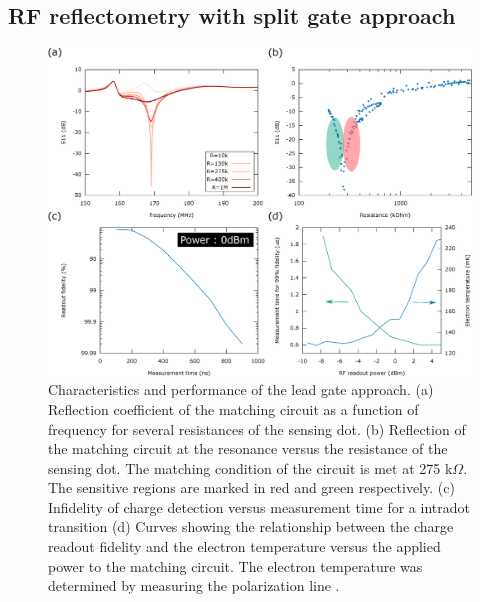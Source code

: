 \documentclass{article}
\begin{document}
\subsection{RF reflectometry with split gate approach}

\begin{figure}
	\includegraphics[width=\textwidth]{figures/Performance_figure/perfomance_fig.eps}
	\caption{Characteristics and performance of the lead gate approach. (a) Reflection coefficient of the matching circuit as a function of frequency for several resistances of the sensing dot. (b) Reflection of the matching circuit at the resonance versus the resistance of the sensing dot. The matching condition of the circuit is met at 275 k$\Omega$. The sensitive regions are marked in red and green respectively. (c) Infidelity of charge detection versus measurement time for a intradot transition (d) Curves showing the relationship between the charge readout fidelity and the electron temperature versus the applied power to the matching circuit. The electron temperature was determined by measuring the polarization line \cite{van2018automated}. }
	\label{fig:lead_gate_result}
\end{figure}	
\end{document}
